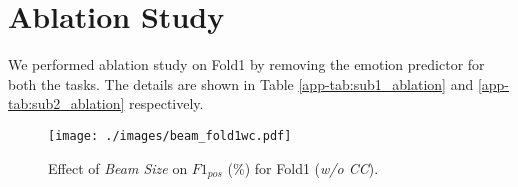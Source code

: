 \documentclass{article}
\begin{document}
\section{Ablation Study} \label{app:ablation}
We performed ablation study on Fold1 by removing the emotion predictor for both the tasks. The details are shown in Table \ref{app-tab:sub1_ablation} and \ref{app-tab:sub2_ablation} respectively. 



\begin{figure}[h]
\centering
  \texttt{[image: ./images/beam\_fold1wc.pdf]}
  \caption{Effect of \textit{Beam Size} on $F1_{pos}$ (\%) for Fold1 (\textit{w/o CC}). }
  \label{fig:beam}
\end{figure}
\end{document}
